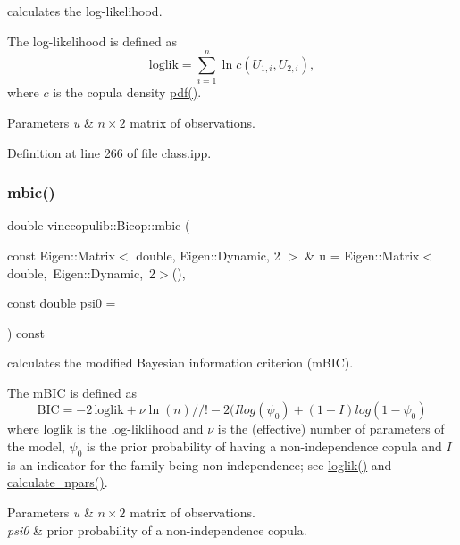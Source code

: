 calculates the log-\/likelihood. 

The log-\/likelihood is defined as \[ \mathrm{loglik} = \sum_{i = 1}^n \ln c(U_{1, i}, U_{2, i}), \] where $ c $ is the copula density \hyperlink{classvinecopulib_1_1_bicop_a6c5a0051c17e74760d4eab394245b3f1}{pdf()}.


\begin{DoxyParams}{Parameters}
{\em u} & $n \times 2$ matrix of observations. \\
\hline
\end{DoxyParams}


Definition at line 266 of file class.\+ipp.

\mbox{\label{classvinecopulib_1_1_bicop_a12e146f82646dbebcd12cccd82d91c00}} 
\subsubsection{\texorpdfstring{mbic()}{mbic()}}
{\footnotesize\ttfamily double vinecopulib\+::\+Bicop\+::mbic (\begin{DoxyParamCaption}\item[{const Eigen\+::\+Matrix$<$ double, Eigen\+::\+Dynamic, 2 $>$ \&}]{u = {\ttfamily Eigen\+:\+:Matrix$<$double,~Eigen\+:\+:Dynamic,~2$>$()},  }\item[{const double}]{psi0 = {} }\end{DoxyParamCaption}) const\hspace{0.3cm}{\ttfamily [inline]}}



calculates the modified Bayesian information criterion (m\+B\+IC). 

The m\+B\+IC is defined as \[ \mathrm{BIC} = -2\, \mathrm{loglik} + \nu \ln(n) //! - 2 (I log(\psi_0) + (1 - I) log(1 - \psi_0) \] where $ \mathrm{loglik} $ is the log-\/liklihood and $ \nu $ is the (effective) number of parameters of the model, $ \psi_0 $ is the prior probability of having a non-\/independence copula and $ I $ is an indicator for the family being non-\/independence; see \hyperlink{classvinecopulib_1_1_bicop_a81979ae3578ec9af1f5f956751faa63d}{loglik()} and \hyperlink{classvinecopulib_1_1_bicop_a8e6b3e3dd484d07cafeb24ca3393f5f0}{calculate\+\_\+npars()}.


\begin{DoxyParams}{Parameters}
{\em u} & $n \times 2$ matrix of observations. \\
\hline
{\em psi0} & prior probability of a non-\/independence copula. \\
\hline
\end{DoxyParams}


